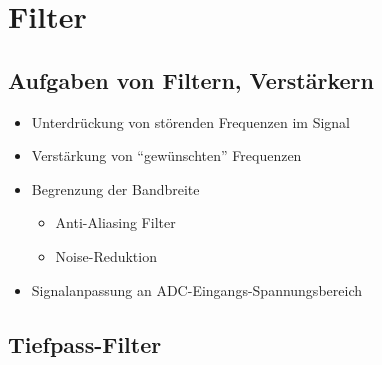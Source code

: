 \section{Filter}

\subsection{Aufgaben von Filtern, Verstärkern}
\begin{itemize}
  \item Unterdrückung von störenden Frequenzen im Signal
  \item Verstärkung von "`gewünschten"' Frequenzen
  \item Begrenzung der Bandbreite
  \begin{itemize}
    \item Anti-Aliasing Filter
    \item Noise-Reduktion
  \end{itemize}
  \item Signalanpassung an ADC-Eingangs-Spannungsbereich
\end{itemize}


\subsection{Tiefpass-Filter}

